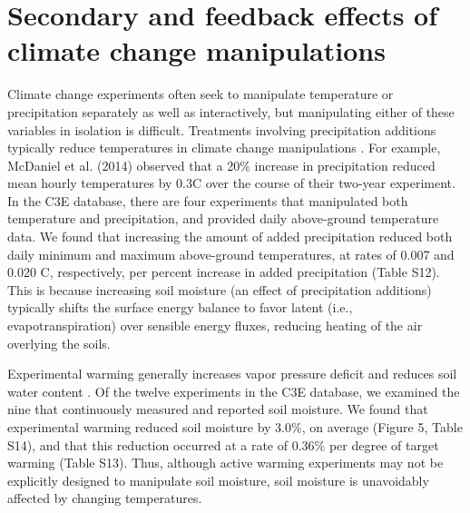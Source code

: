 \documentclass{article}
\begin{document}
\section* {Secondary and feedback effects of climate change manipulations} 
Climate change experiments often seek to manipulate temperature or precipitation separately as well as interactively, but manipulating either of these variables in isolation is difficult.  Treatments involving precipitation additions typically reduce temperatures in climate change manipulations \citep{sherry2007,rollinson2012,mcdaniel2014}. For example, McDaniel et al. (2014) observed that a 20\% increase in precipitation reduced mean hourly temperatures by 0.3\degree C over the course of their two-year experiment. In the C3E database, there are four experiments that manipulated both temperature and precipitation, and provided daily above-ground temperature data. We found that increasing the amount of added precipitation reduced both daily minimum and maximum above-ground temperatures, at rates of 0.007 and 0.020 \degree C, respectively, per percent increase in added precipitation (Table S12). This is because increasing soil moisture (an effect of precipitation additions) typically shifts the surface energy balance to favor latent (i.e., evapotranspiration) over sensible energy fluxes, reducing heating of the air overlying the soils. 
\par Experimental warming generally increases vapor pressure deficit and reduces soil water content \citep[e.g.,][]{sherry2007,morin2010,pelini2014,templer2016}. Of the twelve experiments in the C3E database, we examined the nine that continuously measured and reported soil moisture. We found that experimental warming reduced soil moisture by 3.0\%, on average (Figure 5, Table S14), and that this reduction occurred at a rate of 0.36\% per degree of target warming (Table S13). Thus, although active warming experiments may not be explicitly designed to manipulate soil moisture, soil moisture is unavoidably affected by changing temperatures.
\end{document}
